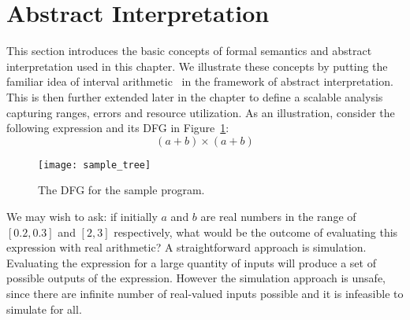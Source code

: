 \section{Abstract Interpretation}
\label{sec:abstract_interpretation}


This section introduces the basic concepts of formal semantics and abstract
interpretation used in this chapter. We illustrate these concepts by putting
the familiar idea of interval arithmetic~\cite{moore} in the framework
of abstract interpretation. This is then further extended later in the
chapter to define a scalable analysis capturing ranges, errors and resource
utilization. As an illustration, consider the following expression and its DFG
in Figure~\ref{fig:sample_tree}\@:
\begin{equation}
    (a + b) \times (a + b)
    \label{eq:absint_sample}
\end{equation}
\begin{figure}[ht]
    \centering
    \texttt{[image: sample\_tree]}
    \caption{The DFG for the sample program.}\label{fig:sample_tree}
\end{figure}

We may wish to ask: if initially $a$ and $b$ are real numbers in the range of
$[0.2, 0.3]$ and $[2, 3]$ respectively, what would be the outcome of evaluating
this expression with real arithmetic? A straightforward approach is simulation.
Evaluating the expression for a large quantity of inputs will produce a set
of possible outputs of the expression. However the simulation approach is
unsafe, since there are infinite number of real-valued inputs possible and it
is infeasible to simulate for all.

